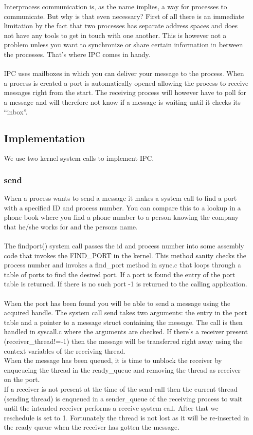 Interprocess communication is, as the name implies, a way for processes to communicate. But why is that even necessary? First of all there is an immediate limitation by the fact that two processes has separate address spaces and does not have any tools to get in touch with one another. This is however not a problem unless you want to synchronize or share certain information in between the processes. That’s where IPC comes in handy.\\
\\
IPC uses mailboxes in which you can deliver your message to the process. When a process is created a port is automatically opened allowing the process to receive messages right from the start. The receiving process will however have to poll for a message and will therefore not know if a message is waiting until it checks its ``inbox''.

\subsection{Implementation}
We use two kernel system calls to implement IPC.
\subsubsection*{send}
When a process wants to send a message it makes a system call to find a port with a specified ID and process number. You can compare this to a lookup in a phone book where you find a phone number to a person knowing the company that he/she works for and the persons name.\\
\\
The findport() system call passes the id and process number into some assembly code that invokes the FIND\_PORT in the kernel. This method sanity checks the process number and invokes a find\_port method in sync.c that loops through a table of ports to find the desired port. If a port is found the entry of the port table is returned. If there is no such port -1 is returned to the calling application.\\
\\
When the port has been found you will be able to send a message using the acquired handle. The system call send takes two arguments: the entry in the port table and a pointer to a message struct containing the message. The call is then handled in syscall.c where the arguments are checked. If there's a receiver present (receiver\_thread!=-1) then the message will be transferred right away using the context variables of the receiving thread.\\
When the message has been queued, it is time to unblock the receiver by enqueueing the thread in the ready\_queue and removing the thread as receiver on the port.\\
If a receiver is not present at the time of the send-call then the current thread (sending thread) is enqueued in a sender\_queue of the receiving process to wait until the intended receiver performs a receive system call. After that we reschedule is set to 1. Fortunately the thread is not lost as it will be re-inserted in the ready queue when the receiver has gotten the message.


